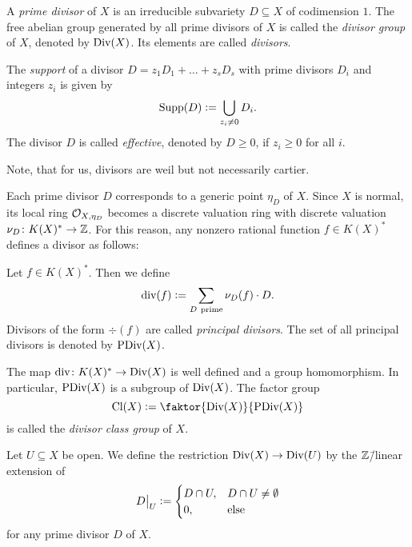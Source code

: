 \begin{defi}[Divisor]
	A \emph{prime divisor} of $X$ is an irreducible subvariety $D\subseteq X$ of codimension $1$. The free abelian group generated by all prime divisors of $X$ is called the \emph{divisor group} of $X$, denoted by $\text{Div}(X)$. Its elements are called \emph{divisors}.
	
	The \emph{support} of a divisor $D = z_1 D_1 + \dots + z_s D_s$ with prime divisors $D_i$ and integers $z_i$ is given by
	$$\text{Supp}(D) \mathrel{\mathop:}= \bigcup_{z_i \neq 0} D_i.$$
	The divisor $D$ is called \emph{effective}, denoted by $D \geq 0$, if $z_i \geq 0 $ for all $i$.
\end{defi}

Note, that for us, divisors are weil but not necessarily cartier.

Each prime divisor $D$ corresponds to a generic point $\eta_D$ of $X$. Since $X$ is normal, its local ring $\mathcal{O}_{X,\eta_D}$ becomes a discrete valuation ring with discrete valuation $\nu_D\colon K(X)^* \rightarrow \mathbb{Z}$. For this reason, any nonzero rational function $f\in K(X)^*$ defines a divisor as follows:

\begin{defi}
	Let $f\in K(X)^*$. Then we define
	$$\div(f) \defeq \sum_{D\ \text{prime}} \nu_D(f) \cdot D.$$
	Divisors of the form $\div(f)$ are called \emph{principal divisors}. The set of all principal divisors is denoted by $\text{PDiv}(X)$.
\end{defi}

\begin{remark}
	The map $\text{div}\colon K(X)^* \rightarrow \text{Div}(X)$ is well defined and a group homomorphism. In particular, $\text{PDiv}(X)$ is a subgroup of $\text{Div}(X)$. The factor group
	$$\Cl(X) \defeq \faktor{\Div(X)}{\PDiv(X)}$$
	is called the \emph{divisor class group} of $X$.
\end{remark}

\begin{defi}
	\label{defi:divisor_restriction}
	Let $U\subseteq X$ be open. We define the restriction $\text{Div}(X) \rightarrow \text{Div}(U)$ by the $\mathbb{Z}$\=/linear extension of 
	$$D{\big |_{U}} \mathrel{\mathop:}= \begin{cases}
	D\cap U, & D\cap U \neq \emptyset \\
	0,	& \text{else}
	\end{cases}$$
	for any prime divisor $D$ of $X$.
\end{defi}

